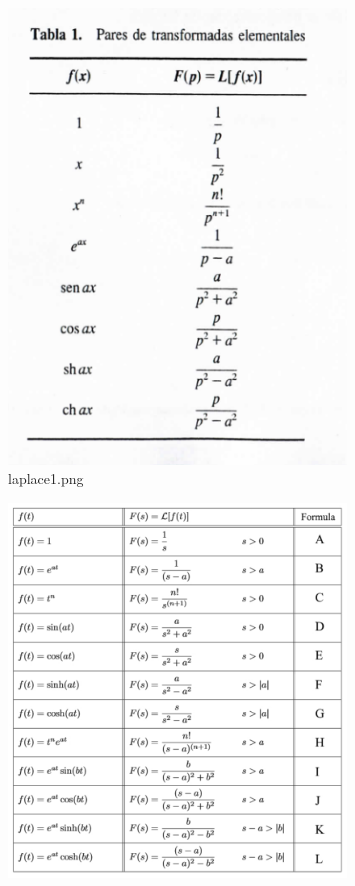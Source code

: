 \documentclass[12pt]{exam}
\begin{document}
\begin{enumerate}
\begin{figure}[H]
      \includegraphics[width=0.8\textwidth]{laplace1.png}
      \caption{laplace1.png}
      \label{fig:laplace1-png}
    \end{figure}
    \begin{figure}[H]
      \centering
      \includegraphics[width=0.8\textwidth]{laplace2.png}

\end{figure}
\end{enumerate}
\end{document}
